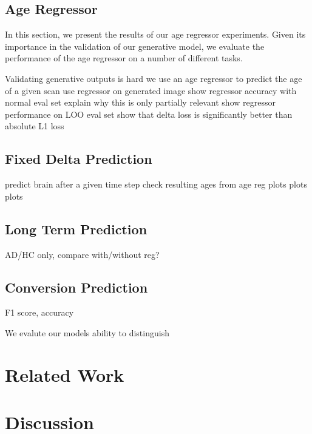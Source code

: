 \section{Age Regressor} \label{sec:expagereg}
In this section, we present the results of our age regressor experiments. Given its importance in the validation of our generative model, we evaluate the performance of the age regressor on a number of different tasks.

Validating generative outputs is hard
we use an age regressor to predict the age of a given scan
use regressor on generated image
show regressor accuracy with normal eval set
explain why this is only partially relevant
show regressor performance on LOO eval set
show that delta loss is significantly better than absolute L1 loss

\section{Fixed Delta Prediction}
predict brain after a given time step
check resulting ages from age reg
plots plots plots

\section{Long Term Prediction}
AD/HC only, compare
with/without reg?

\section{Conversion Prediction}
F1 score, accuracy

We evalute our models ability to distinguish 

\chapter{Related Work}

\chapter{Discussion}

